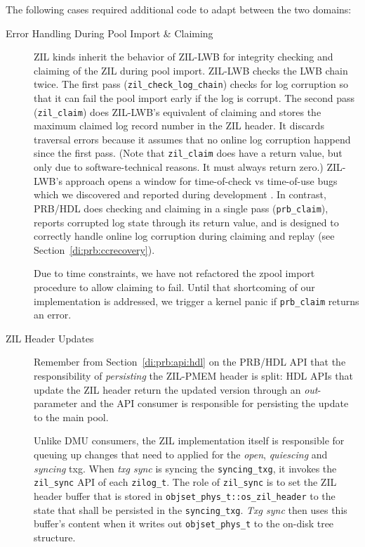 \documentclass[12pt,a4paper,twoside]{book}
\begin{document}
The following cases required additional code to adapt between the two domains:
\begin{description}
    \item[Error Handling During Pool Import \& Claiming]
        ZIL kinds inherit the behavior of ZIL-LWB for integrity checking and claiming of the ZIL during pool import.
        ZIL-LWB checks the LWB chain twice.
        The first pass (\lstinline{zil_check_log_chain}) checks for log corruption so that it can fail the pool import early if the log is corrupt.
        The second pass (\lstinline{zil_claim}) does ZIL-LWB's equivalent of claiming and stores the maximum claimed log record number in the ZIL header.
        It discards traversal errors because it assumes that no online log corruption happend since the first pass.
        (Note that \lstinline{zil_claim} does have a return value, but only due to software-technical reasons. It must always return zero.)
        ZIL-LWB's approach opens a window for time-of-check vs time-of-use bugs which we discovered and reported during development \cite{OpenZFSGithubIssueHandlingOfLostClaimedNotReplayedLogRecords}.
        In contrast, PRB/HDL does checking and claiming in a single pass (\lstinline{prb_claim}), reports corrupted log state through its return value, and is designed to correctly handle online log corruption during claiming and replay (see Section~\ref{di:prb:ccrecovery}).

        Due to time constraints, we have not refactored the zpool import procedure to allow claiming to fail.
        Until that shortcoming of our implementation is addressed, we trigger a kernel panic if \lstinline{prb_claim} returns an error.

    \item[ZIL Header Updates]
        Remember from Section~\ref{di:prb:api:hdl} on the PRB/HDL API that the responsibility of \textit{persisting} the ZIL-PMEM header is split:
        HDL APIs that update the ZIL header return the updated version through an \textit{out}-parameter and the API consumer is responsible for persisting the update to the main pool.

        Unlike DMU consumers, the ZIL implementation itself is responsible for queuing up changes that need to applied for the \textit{open}, \textit{quiescing} and \textit{syncing} txg.
        When \textit{txg sync} is syncing the \lstinline{syncing_txg}, it invokes the \lstinline{zil_sync} API of each \lstinline{zilog_t}.
        The role of \lstinline{zil_sync} is to set the ZIL header buffer that is stored in \lstinline{objset_phys_t::os_zil_header} to the state that shall be persisted in the \lstinline{syncing_txg}.
        \textit{Txg sync} then uses this buffer's content when it writes out \lstinline{objset_phys_t} to the on-disk tree structure.


\end{description}
\end{document}
